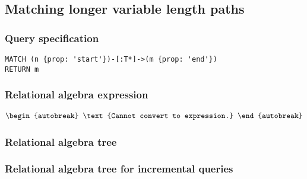 
\subsection{Matching longer variable length paths}

\subsubsection*{Query specification}

\begin{lstlisting}
MATCH (n {prop: 'start'})-[:T*]->(m {prop: 'end'})
RETURN m
\end{lstlisting}

\subsubsection*{Relational algebra expression}

\begin{align*}
\begin{autobreak}
\text{Cannot convert to expression.}
\end{autobreak}
\end{align*}

\subsubsection*{Relational algebra tree}


\subsubsection*{Relational algebra tree for incremental queries}


